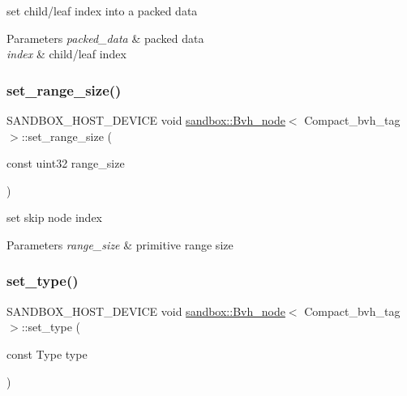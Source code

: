 set child/leaf index into a packed data


\begin{DoxyParams}{Parameters}
{\em packed\+\_\+data} & packed data \\
\hline
{\em index} & child/leaf index \\
\hline
\end{DoxyParams}
\mbox{\label{structsandbox_1_1_bvh__node_3_01_compact__bvh__tag_01_4_adae271ac82a8cccff79c4686aa4a6c9c}} 
\subsubsection{\texorpdfstring{set\+\_\+range\+\_\+size()}{set\_range\_size()}}
{\footnotesize\ttfamily S\+A\+N\+D\+B\+O\+X\+\_\+\+H\+O\+S\+T\+\_\+\+D\+E\+V\+I\+CE void \hyperlink{structsandbox_1_1_bvh__node}{sandbox\+::\+Bvh\+\_\+node}$<$ Compact\+\_\+bvh\+\_\+tag $>$\+::set\+\_\+range\+\_\+size (\begin{DoxyParamCaption}\item[{const uint32}]{range\+\_\+size }\end{DoxyParamCaption})\hspace{0.3cm}{\ttfamily [inline]}}

set skip node index


\begin{DoxyParams}{Parameters}
{\em range\+\_\+size} & primitive range size \\
\hline
\end{DoxyParams}
\mbox{\label{structsandbox_1_1_bvh__node_3_01_compact__bvh__tag_01_4_a2b45390013155840bb1c19ede4a7cc10}} 
\subsubsection{\texorpdfstring{set\+\_\+type()}{set\_type()}\hspace{0.1cm}{\footnotesize\ttfamily [1/2]}}
{\footnotesize\ttfamily S\+A\+N\+D\+B\+O\+X\+\_\+\+H\+O\+S\+T\+\_\+\+D\+E\+V\+I\+CE void \hyperlink{structsandbox_1_1_bvh__node}{sandbox\+::\+Bvh\+\_\+node}$<$ Compact\+\_\+bvh\+\_\+tag $>$\+::set\+\_\+type (\begin{DoxyParamCaption}\item[{const Type}]{type }\end{DoxyParamCaption})}


